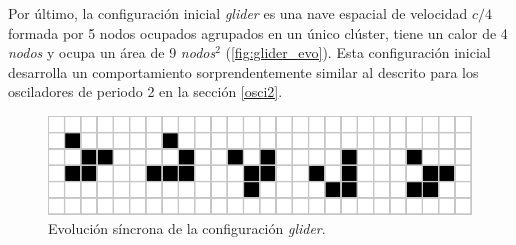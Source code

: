 \documentclass[../proyecto.tex]{memoir}
\begin{document}
Por último, la configuración inicial \textit{glider} es una nave espacial de velocidad $c/4$ formada por 5 nodos ocupados agrupados en un único clúster, tiene un calor de 4 \textit{nodos} y ocupa un área de 9 \textit{nodos}$^2$ (\autoref{fig:glider_evo}). Esta configuración inicial desarrolla un comportamiento sorprendentemente similar al descrito para los osciladores de periodo 2 en la sección \ref{osci2}.

\begin{figure}[H]
	\centering
    \includegraphics[width=\textwidth]{./images/glider_evo.png}
    \caption{Evolución síncrona de la configuración \textit{glider}.}
    \label{fig:lightweightspaceship_evo}
\end{figure}



\end{document}
